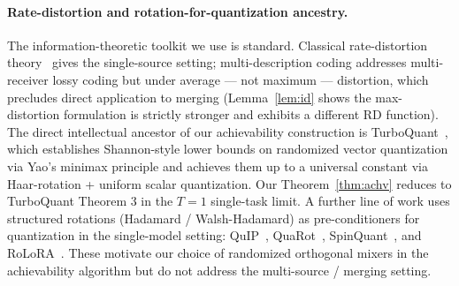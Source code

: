 \paragraph{Rate-distortion and rotation-for-quantization ancestry.}
The information-theoretic toolkit we use is standard. Classical
rate-distortion theory~\cite{shannon1959rd,coverthomas} gives
the single-source setting; multi-description coding
\cite{elgamalcover1982md} addresses multi-receiver lossy coding
but under average — not maximum — distortion, which precludes
direct application to merging (Lemma~\ref{lem:id} shows the
max-distortion formulation is strictly stronger and exhibits a
different RD function). The direct intellectual ancestor of our
achievability construction is
TurboQuant~\cite{zandieh2025turboquant}, which establishes
Shannon-style lower bounds on randomized vector quantization via
Yao's minimax principle and achieves them up to a universal
constant via Haar-rotation + uniform scalar quantization. Our
Theorem~\ref{thm:achv} reduces to TurboQuant Theorem 3 in the
$T=1$ single-task limit. A further line of work uses structured
rotations (Hadamard / Walsh-Hadamard) as pre-conditioners for
quantization in the single-model setting:
QuIP~\cite{tseng2024quip}, QuaRot~\cite{ashkboos2024quarot},
SpinQuant~\cite{liu2025spinquant}, and
RoLoRA~\cite{xi2024rolora}. These motivate our choice of
randomized orthogonal mixers in the achievability algorithm but
do not address the multi-source / merging setting.

